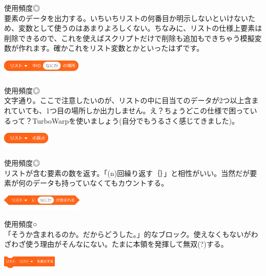 \documentclass[b5paper,10pt]{jsarticle}
\begin{document}
\begin{multicols*}{3}
\begin{itembox}{6}
\end{itembox}
使用頻度◎\\
要素のデータを出力する。いちいちリストの何番目か明示しないといけないため、変数として使うのはあまりよろしくない。ちなみに、リストの仕様上要素は削除できるので、これを使えばスクリプトだけで削除も追加もできちゃう模擬変数が作れます。確かこれをリスト変数とかといったはずです。
\begin{itembox}{7}
\includegraphics[height=8mm]{images/lists_7.png}
\end{itembox}
使用頻度◎\\
文字通り。ここで注意したいのが、リストの中に目当てのデータが2つ以上含まれていても、1つ目の場所しか出力しません。え？ちょうどこの仕様で困っているって？TurboWarpを使いましょう(自分でもうるさく感じてきました)。
\begin{itembox}{8}
\includegraphics[height=8mm]{images/lists_8.png}
\end{itembox}
使用頻度◎\\
リストが含む要素の数を返す。「(n)回繰り返す｛｝」と相性がいい。当然だが要素が何のデータも持っていなくてもカウントする。
\begin{itembox}{9}
\includegraphics[width=39mm]{images/lists_9.png}
\end{itembox}
使用頻度○\\
「そうか含まれるのか。だからどうした。」的なブロック。使えなくもないがわざわざ使う理由がそんなにない。たまに本領を発揮して無双(?)する。
\begin{itembox}{10}
\includegraphics[height=8mm]{images/lists_10.png}


\end{itembox}
\end{multicols*}
\end{document}

